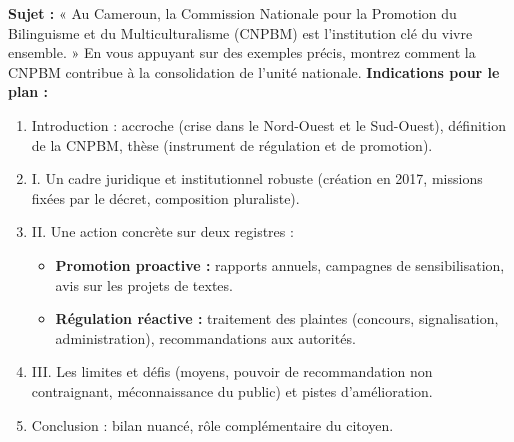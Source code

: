 \documentclass[11pt]{article}
\begin{document}
\begin{exercice}
\textbf{Sujet :} « Au Cameroun, la Commission Nationale pour la Promotion du Bilinguisme et du Multiculturalisme (CNPBM) est l'institution clé du vivre ensemble. » 
En vous appuyant sur des exemples précis, montrez comment la CNPBM contribue à la consolidation de l'unité nationale.
\textbf{Indications pour le plan :}
\begin{enumerate}
    \item Introduction : accroche (crise dans le Nord-Ouest et le Sud-Ouest), définition de la CNPBM, thèse (instrument de régulation et de promotion).
    \item I. Un cadre juridique et institutionnel robuste (création en 2017, missions fixées par le décret, composition pluraliste).
    \item II. Une action concrète sur deux registres : 
        \begin{itemize}
            \item \textbf{Promotion proactive :} rapports annuels, campagnes de sensibilisation, avis sur les projets de textes.
            \item \textbf{Régulation réactive :} traitement des plaintes (concours, signalisation, administration), recommandations aux autorités.
        \end{itemize}
    \item III. Les limites et défis (moyens, pouvoir de recommandation non contraignant, méconnaissance du public) et pistes d'amélioration.
    \item Conclusion : bilan nuancé, rôle complémentaire du citoyen.
\end{enumerate}
\end{exercice}
\end{document}
